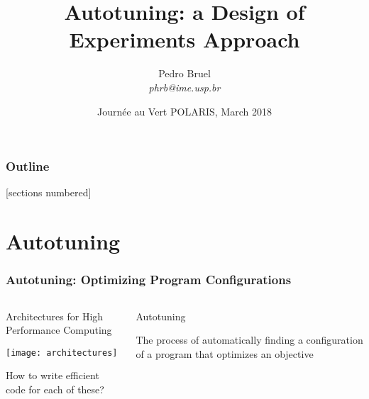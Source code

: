 \documentclass[10pt, compress, aspectratio=169, xcolor={table,usenames,dvipsnames}]{beamer}
\title{Autotuning: a Design of Experiments Approach}
\author{\footnotesize Pedro Bruel \\ {\scriptsize \emph{phrb@ime.usp.br}}}
\date{\scriptsize Journée au Vert POLARIS, March 2018}
\begin{document}
\maketitle

\begin{frame}
    \frametitle{Outline}
    [sections numbered]
    \tableofcontents[hideallsubsections]
\end{frame}

\section{Autotuning}

\begin{frame}
    \frametitle{Autotuning: Optimizing Program Configurations}
    \begin{columns}[c]
            \begin{block}{Architectures for High Performance Computing}
                \begin{center}
                    \texttt{[image: architectures]}
                \end{center}

                How to write \alert{efficient code} for each of these?
            \end{block}

            \begin{block}{Autotuning}

                \vspace{.2cm}

                The process of \alert{automatically finding} a
                \alert{configuration} of a program that optimizes an
                \alert{objective}
            \end{block}


\end{columns}
\end{frame}
\end{document}
